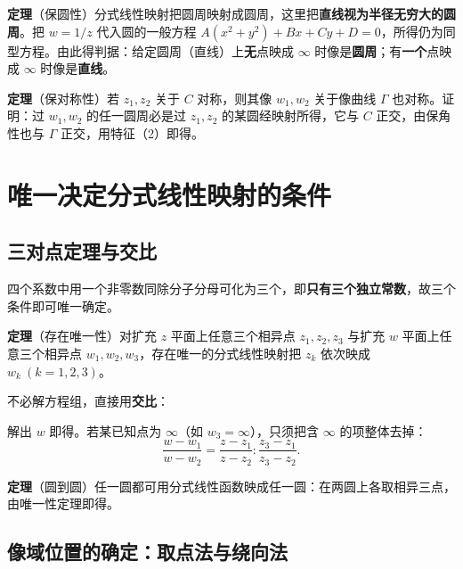 \textbf{定理}（保圆性）\quad 分式线性映射把圆周映射成圆周，这里把\textbf{直线视为半径无穷大的圆周}。把 \(w=1/z\) 代入圆的一般方程 \(A(x^{2}+y^{2})+Bx+Cy+D=0\)，所得仍为同型方程。由此得判据：给定圆周（直线）上\textbf{无}点映成 \(\infty\) 时像是\textbf{圆周}；有\textbf{一个}点映成 \(\infty\) 时像是\textbf{直线}。

\textbf{定理}（保对称性）\quad 若 \(z_{1},z_{2}\) 关于 \(C\) 对称，则其像 \(w_{1},w_{2}\) 关于像曲线 \(\Gamma\) 也对称。证明：过 \(w_{1},w_{2}\) 的任一圆周必是过 \(z_{1},z_{2}\) 的某圆经映射所得，它与 \(C\) 正交，由保角性也与 \(\Gamma\) 正交，用特征（2）即得。


\section{唯一决定分式线性映射的条件}

\subsection{三对点定理与交比}

四个系数中用一个非零数同除分子分母可化为三个，即\textbf{只有三个独立常数}，故三个条件即可唯一确定。

\textbf{定理}（存在唯一性）\quad 对扩充 \(z\) 平面上任意三个相异点 \(z_{1},z_{2},z_{3}\) 与扩充 \(w\) 平面上任意三个相异点 \(w_{1},w_{2},w_{3}\)，存在唯一的分式线性映射把 \(z_{k}\) 依次映成 \(w_{k}\ (k=1,2,3)\)。

不必解方程组，直接用\textbf{交比}：


解出 \(w\) 即得。若某已知点为 \(\infty\)（如 \(w_{3}=\infty\)），只须把含 \(\infty\) 的项整体去掉：
\[
\frac{w-w_{1}}{w-w_{2}}=\frac{z-z_{1}}{z-z_{2}}:\frac{z_{3}-z_{1}}{z_{3}-z_{2}} .
\]

\textbf{定理}（圆到圆）\quad 任一圆都可用分式线性函数映成任一圆：在两圆上各取相异三点，由唯一性定理即得。

\subsection{像域位置的确定：取点法与绕向法}

